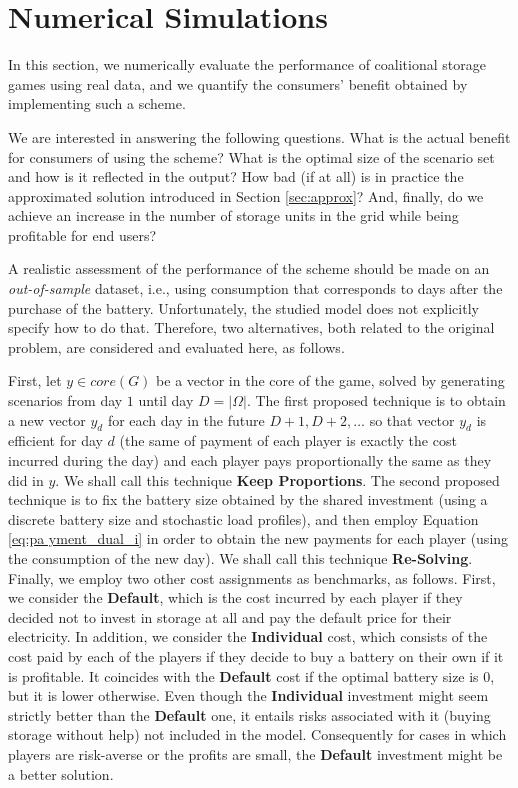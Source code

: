 \section{Numerical Simulations}

In this section, we numerically evaluate the performance of coalitional storage games using real data, and we quantify the consumers' benefit obtained by implementing such a scheme.

We are interested in answering the following questions. What is the actual benefit for consumers of using the scheme? What is the optimal size of the scenario set and how is it reflected in the output? How bad (if at all) is in practice the approximated solution introduced in Section \ref{sec:approx}? And, finally, do we achieve an increase in the number of storage units in the grid while being profitable for end users? 

A realistic assessment of the performance of the scheme should be made on an \textit{out-of-sample} dataset, i.e., using consumption that corresponds to days after the purchase of the battery. Unfortunately, the studied model does not explicitly specify how to do that. Therefore, two alternatives, both related to the original problem, are considered and evaluated here, as follows.

First, let $y \in core(G)$ be a vector in the core of the game, solved by generating scenarios from day $1$ until day $D=|\Omega|$. The first proposed technique is to obtain a new vector $y_d$ for each day in the future $D+1, D+2, \dots$ so that vector $y_d$ is efficient for day $d$ (the same of payment of each player is exactly the cost incurred during the day) and each player pays proportionally the same as they did in $y$. We shall call this technique \textbf{Keep Proportions}.
The second proposed technique is to fix the battery size obtained by the shared investment (using a discrete battery size and stochastic load profiles), and then employ Equation \eqref{eq:pa
yment_dual_i} in order to obtain the new payments for each player (using the consumption of the new day). We shall call this technique \textbf{Re-Solving}.
Finally, we employ two other cost assignments as benchmarks, as follows. First, we consider the \textbf{Default}, which is the cost incurred by each player if they decided not to invest in storage at all and pay the default price for their electricity. In addition, we consider the \textbf{Individual} cost, which consists of the cost paid by each of the players if they decide to buy a battery on their own if it is profitable. It coincides with the \textbf{Default} cost if the optimal battery size is $0$, but it is lower otherwise. Even though the \textbf{Individual} investment might seem strictly better than the \textbf{Default} one, it entails risks associated with it (buying storage without help) not included in the model. Consequently for cases in which players are risk-averse or the profits are small, the \textbf{Default} investment might be a better solution.

